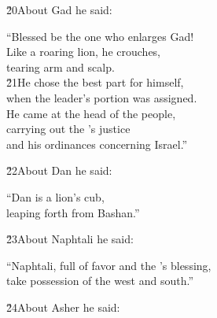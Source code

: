 \v{20}About Gad he said:

\begin{poetry}
\poeml ``Blessed be the one who enlarges Gad! \\
\poemll    Like a roaring lion, he crouches, \\
\poemlll       tearing arm and scalp. \\
\poeml \v{21}He chose the best part for himself, \\
\poemll    when the leader's portion was assigned. \\
\poeml He came at the head of the people, \\
\poemll    carrying out the 's justice \\
\poemlll       and his ordinances concerning Israel.''
\end{poetry}

\v{22}About Dan he said:

\begin{poetry}
\poeml ``Dan is a lion's cub, \\
\poemll    leaping forth from Bashan.''
\end{poetry}

\v{23}About Naphtali he said:

\begin{poetry}
\poeml ``Naphtali, full of favor and the 's blessing, \\
\poemll    take possession of the west and south.''
\end{poetry}

\v{24}About Asher he said:


